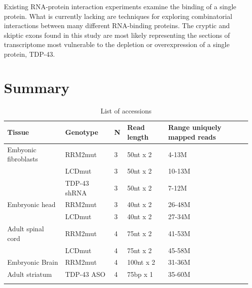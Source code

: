 Existing RNA-protein interaction experiments examine the binding of a single protein. What is currently lacking are techniques for exploring combinatorial interactions between many different RNA-binding proteins. The cryptic and skiptic exons found in this study are most likely representing the sections of transcriptome most vulnerable to the depletion or overexpression of a single protein, TDP-43.

		
\section{Summary}


\begin{table}[h!]
	\caption{List of accessions}
	\begin{footnotesize}
		\begin{tabular}{lllll}
		Tissue & Genotype & N &	Read length & Range uniquely mapped reads\\
		\hline	
		Embyonic fibroblasts & RRM2mut &3 &50nt	x 2 & 4-13M\\
			& LCDmut & 3 & 50nt	x	2 & 10-13M\\
			& TDP-43 shRNA & 3 & 50nt x 2 & 7-12M\\
		Embryonic head & RRM2mut & 3 & 40nt	x	2 & 26-48M\\
			& LCDmut & 3 & 40nt	x 2 & 27-34M \\
		Adult	spinal	cord & RRM2mut & 4 & 75nt x	2 & 41-53M\\
			& LCDmut & 4 & 75nt x 2 & 45-58M\\
		Embryonic	Brain	& RRM2mut & 4 & 100nt x 2 & 31-36M\\
		Adult striatum & TDP-43 ASO & 4 & 75bp x 1 & 35-60M\\
		\citep{Polymenidou2011-hs}
		\end{tabular}
	\end{footnotesize}
\end{table}